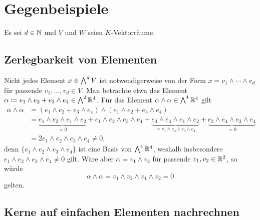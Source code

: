 \section{Gegenbeispiele}

Es sei $d \in \mathbb{N}$ und $V$ und $W$ seien $K$-Vektorräume.





\subsection{Zerlegbarkeit von Elementen}

Nicht jedes Element $x \in \bigwedge^{d} V$ ist notwendigerweise von der Form $x = v_1 \wedge \dotsb \wedge v_d$ für passende $v_1, \dotsc, v_d \in V$.
Man betrachte etwa das Element $\alpha \coloneqq e_1 \wedge e_2 + e_3 \wedge e_4 \in \bigwedge^{2} \mathbb{R}^4$.
Für das Element $\alpha \wedge \alpha \in \bigwedge^{4} \mathbb{R}^4$ gilt
\begin{align*}
        \alpha \wedge \alpha
  &=    (e_1 \wedge e_2 + e_3 \wedge e_4) \wedge (e_1 \wedge e_2 + e_3 \wedge e_4)
  \\
  &=      \underbrace{e_1 \wedge e_2 \wedge e_1 \wedge e_2}_{=0}
        + e_1 \wedge e_2 \wedge e_3 \wedge e_4
        + \underbrace{e_3 \wedge e_4 \wedge e_1 \wedge e_2}_{= e_1 \wedge e_2 \wedge e_3 \wedge e_4}
        + \underbrace{e_3 \wedge e_4 \wedge e_3 \wedge e_4}_{=0}
  \\
  &=    2 e_1 \wedge e_2 \wedge e_3 \wedge e_4
   \neq 0,
\end{align*}
denn $\{e_1 \wedge e_2 \wedge e_3 \wedge e_4\}$ ist eine Basis von $\bigwedge^{4} \mathbb{R}^4$, weshalb insbesondere $e_1 \wedge e_2 \wedge e_3 \wedge e_4 \neq 0$ gilt.
Wäre aber $\alpha = v_1 \wedge v_2$ für passende $v_1, v_2 \in \mathbb{R}^2$, so würde
\[
    \alpha \wedge \alpha
  = v_1 \wedge v_2 \wedge v_1 \wedge v_2
  = 0
\]
gelten.





\subsection{Kerne auf einfachen Elementen nachrechnen}

